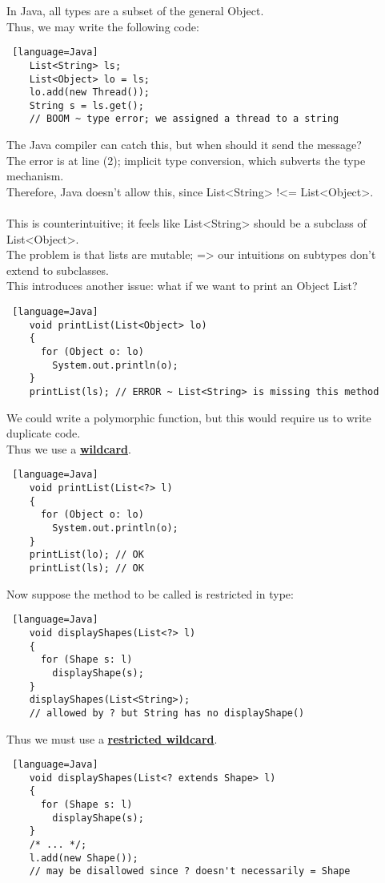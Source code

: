 \documentclass[../../lecture_notes.tex]{subfiles}
\begin{document}
\noindent In Java, all types are a subset of the general Object.\\
Thus, we may write the following code:
\begin{lstlisting} [language=Java]
	List<String> ls;
	List<Object> lo = ls;
	lo.add(new Thread());
	String s = ls.get(); 
	// BOOM ~ type error; we assigned a thread to a string
\end{lstlisting}

\noindent The Java compiler can catch this, but when should it send the message?\\
\indent The error is at line (2); implicit type conversion, which subverts the type mechanism.\\
Therefore, Java doesn’t allow this, since List<String> !<= List<Object>.\\
\\
 This is counterintuitive; it feels like List<String> should be a subclass of List<Object>.\\
 The problem is that lists are mutable; => our intuitions on subtypes don’t extend to subclasses.\\

This introduces another issue: what if we want to print an Object List?
\begin{lstlisting} [language=Java]
	void printList(List<Object> lo)
	{
	  for (Object o: lo)
	    System.out.println(o);
	}
	printList(ls); // ERROR ~ List<String> is missing this method
\end{lstlisting} \medskip

\noindent We could write a polymorphic function, but this would require us to write duplicate code.\\
Thus we use a \textbf{\underline{wildcard}}.
\begin{lstlisting} [language=Java]
	void printList(List<?> l)
	{
	  for (Object o: lo)
	    System.out.println(o);
	}
	printList(lo); // OK
	printList(ls); // OK
\end{lstlisting} \medskip

\noindent Now suppose the method to be called is restricted in type:
\begin{lstlisting} [language=Java]
	void displayShapes(List<?> l)
	{
	  for (Shape s: l)
	    displayShape(s);
	}
	displayShapes(List<String>);
	// allowed by ? but String has no displayShape()
\end{lstlisting} \medskip

\noindent Thus we must use a \textbf{\underline{restricted wildcard}}.
\begin{lstlisting} [language=Java]
	void displayShapes(List<? extends Shape> l)
	{
	  for (Shape s: l)
	    displayShape(s);
	}
	/* ... */;
	l.add(new Shape()); 
	// may be disallowed since ? doesn't necessarily = Shape
\end{lstlisting} \medskip
\end{document}
